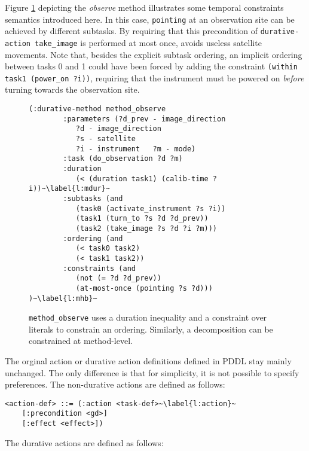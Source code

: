 \documentclass[letterpaper]{article} %
\begin{document}
Figure \ref{pddl_durative_m_con} depicting the \textit{observe} method illustrates some temporal constraints semantics introduced here.
In this case, \texttt{pointing} at an observation site can be achieved by different subtasks. By requiring that this precondition of \mbox{\small\lstinline[language={pddl},basicstyle=\ttfamily]|durative-action take_image|} is performed  at most once, avoids useless satellite movements.
Note that, besides the explicit subtask ordering, an implicit ordering between tasks 0 and 1 could have been forced by adding the constraint  \mbox{\small\lstinline[language={pddl},basicstyle=\ttfamily]|(within task1 (power_on ?i))|}, requiring that the instrument must be powered on \emph{before} turning towards the observation site.
%
\begin{figure}[h!]
	\begin{lstlisting}[language=pddl, basicstyle=\fontsize{8.5}{10}\selectfont\ttfamily, escapechar=~]
	(:durative-method method_observe
		:parameters (?d_prev - image_direction
		   ?d - image_direction
		   ?s - satellite
		   ?i - instrument   ?m - mode)
		:task (do_observation ?d ?m)
		:duration
		   (< (duration task1) (calib-time ?i))~\label{l:mdur}~
		:subtasks (and
		   (task0 (activate_instrument ?s ?i))
		   (task1 (turn_to ?s ?d ?d_prev))
		   (task2 (take_image ?s ?d ?i ?m)))
		:ordering (and
		   (< task0 task2)
		   (< task1 task2))
		:constraints (and
		   (not (= ?d ?d_prev))
		   (at-most-once (pointing ?s ?d))) )~\label{l:mhb}~
	\end{lstlisting}
	\caption{\texttt{method\_observe} uses a duration inequality and a constraint over literals to constrain an ordering. Similarly, a decomposition can be constrained at method-level.\label{pddl_durative_m_con}}
\end{figure}


%
%
The orginal action or durative action definitions defined in PDDL stay mainly unchanged. The only difference is that for simplicity, it is not possible to specify preferences. The non-durative actions are defined as follows:

\begin{lstlisting}[firstnumber=last, escapechar=~]
<action-def> ::= (:action <task-def>~\label{l:action}~
    [:precondition <gd>]
    [:effect <effect>])
\end{lstlisting}

%
%
\noindent The durative actions are defined as follows:
\end{document}
